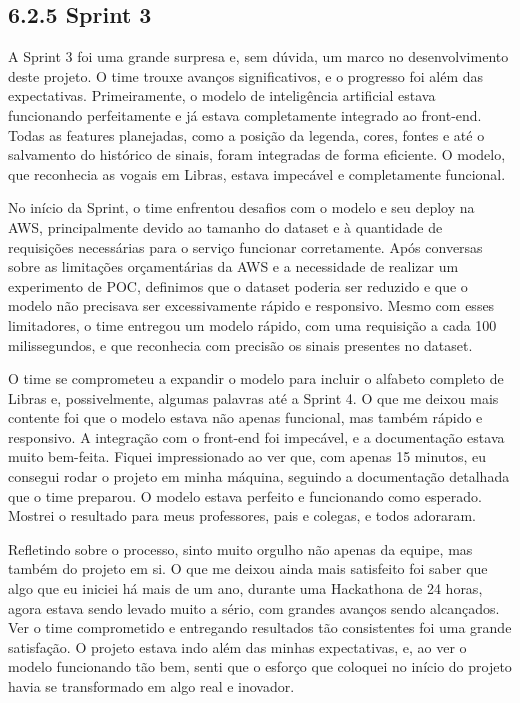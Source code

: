 \hypertarget{__RefHeading___Toc4470_311817663331}{}

\subsection*{6.2.5 Sprint 3}
\label{cliente-hoortech:text-h-0034}

A Sprint 3 foi uma grande surpresa e, sem dúvida, um marco no desenvolvimento deste projeto. O time trouxe avanços significativos, e o progresso foi além das expectativas. Primeiramente, o modelo de inteligência artificial estava funcionando perfeitamente e já estava completamente integrado ao front-end. Todas as features planejadas, como a posição da legenda, cores, fontes e até o salvamento do histórico de sinais, foram integradas de forma eficiente. O modelo, que reconhecia as vogais em Libras, estava impecável e completamente funcional.\par

No início da Sprint, o time enfrentou desafios com o modelo e seu deploy na AWS, principalmente devido ao tamanho do dataset e à quantidade de requisições necessárias para o serviço funcionar corretamente. Após conversas sobre as limitações orçamentárias da AWS e a necessidade de realizar um experimento de POC, definimos que o dataset poderia ser reduzido e que o modelo não precisava ser excessivamente rápido e responsivo. Mesmo com esses limitadores, o time entregou um modelo rápido, com uma requisição a cada 100 milissegundos, e que reconhecia com precisão os sinais presentes no dataset.\par

O time se comprometeu a expandir o modelo para incluir o alfabeto completo de Libras e, possivelmente, algumas palavras até a Sprint 4. O que me deixou mais contente foi que o modelo estava não apenas funcional, mas também rápido e responsivo. A integração com o front-end foi impecável, e a documentação estava muito bem-feita. Fiquei impressionado ao ver que, com apenas 15 minutos, eu consegui rodar o projeto em minha máquina, seguindo a documentação detalhada que o time preparou. O modelo estava perfeito e funcionando como esperado. Mostrei o resultado para meus professores, pais e colegas, e todos adoraram.\par

Refletindo sobre o processo, sinto muito orgulho não apenas da equipe, mas também do projeto em si. O que me deixou ainda mais satisfeito foi saber que algo que eu iniciei há mais de um ano, durante uma Hackathona de 24 horas, agora estava sendo levado muito a sério, com grandes avanços sendo alcançados. Ver o time comprometido e entregando resultados tão consistentes foi uma grande satisfação. O projeto estava indo além das minhas expectativas, e, ao ver o modelo funcionando tão bem, senti que o esforço que coloquei no início do projeto havia se transformado em algo real e inovador.\par

